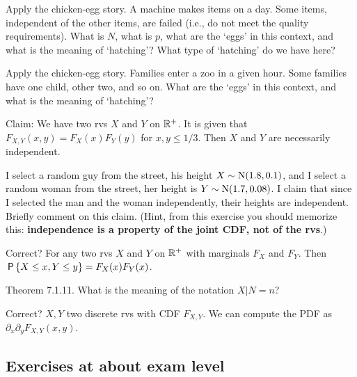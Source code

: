 \documentclass[assignments]{subfiles}
\begin{document}
\begin{exercise}
Apply the chicken-egg story.
A machine makes items on a day.
Some items, independent of the other items, are failed (i.e., do not meet the quality requirements).
What is $N$, what is $p$, what are the `eggs' in this context, and what is the meaning of `hatching'?
What type of `hatching' do we have here?
\end{exercise}

\begin{exercise}
Apply the chicken-egg story. Families enter a zoo in a given hour. Some families have one child, other two, and so on. 
What are the `eggs' in this context, and what is the meaning of `hatching'? 
\end{exercise}


\begin{exercise}
Claim: We have two rvs $X$ and $Y$ on $\R^{+}$. It is given that $F_{X,Y}(x,y) = F_X(x)F_Y(y)$ for $x,y \leq 1/3$. Then  $X$ and $Y$ are necessarily independent. 
\end{exercise}

\begin{exercise}
I select a random guy from the street, his height $X\sim\Norm{1.8, 0.1}$, and I select a random woman from the street, her height is $Y\sim\Norm{1.7, 0.08}$.
I claim that since I selected the man and the woman independently, their heights are independent.
Briefly comment on this claim.
(Hint, from this exercise you should memorize this: \textbf{independence is a property of the joint CDF, not of the rvs}.)
\end{exercise}


\begin{exercise}
Correct? For any two rvs $X$ and $Y$ on $\R^{+}$ with marginals $F_{X}$ and $F_{Y}$. Then $\P{X\leq x, Y\leq y} = F_{X}(x) F_{Y}(x)$.
\end{exercise}

\begin{exercise}
Theorem 7.1.11. What is the meaning of the notation $X|N=n$?
\end{exercise}

\begin{exercise}
Correct? $X, Y$ two discrete rvs with CDF $F_{X,Y}$. We can compute the PDF as $\partial_{x}\partial_{y} F_{X,Y}(x,y)$.
\end{exercise}


\subsection{Exercises at about exam level}
\label{sec:below-exam-level}
\end{document}
